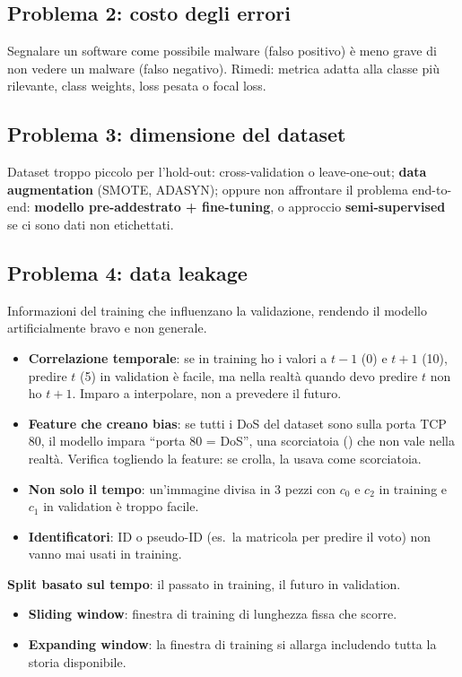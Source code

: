 \subsection{Problema 2: costo degli errori}
Segnalare un software come possibile malware (falso positivo) è meno grave di non vedere un malware (falso negativo).
Rimedi: metrica adatta alla classe più rilevante, class weights, loss pesata o focal loss.

\subsection{Problema 3: dimensione del dataset}
Dataset troppo piccolo per l'hold-out: cross-validation o leave-one-out; \textbf{data augmentation} (SMOTE, ADASYN);
oppure non affrontare il problema end-to-end: \textbf{modello pre-addestrato + fine-tuning}, o approccio
\textbf{semi-supervised} se ci sono dati non etichettati.

\subsection{Problema 4: data leakage}
\begin{definizione}
Informazioni del training che influenzano la validazione, rendendo il modello artificialmente bravo e non generale.
\end{definizione}
\begin{itemize}
  \item \textbf{Correlazione temporale}: se in training ho i valori a $t-1$ (0) e $t+1$ (10), predire $t$ (5) in validation è
        facile, ma nella realtà quando devo predire $t$ non ho $t+1$. Imparo a interpolare, non a prevedere il futuro.
  \item \textbf{Feature che creano bias}: se tutti i DoS del dataset sono sulla porta TCP 80, il modello impara ``porta 80 = DoS'',
        una scorciatoia () che non vale nella realtà. Verifica togliendo la feature: se crolla, la usava come scorciatoia.
  \item \textbf{Non solo il tempo}: un'immagine divisa in 3 pezzi con $c_0$ e $c_2$ in training e $c_1$ in validation è troppo facile.
  \item \textbf{Identificatori}: ID o pseudo-ID (es.\ la matricola per predire il voto) non vanno mai usati in training.
\end{itemize}
\textbf{Split basato sul tempo}: il passato in training, il futuro in validation.
\begin{itemize}
  \item \textbf{Sliding window}: finestra di training di lunghezza fissa che scorre.
  \item \textbf{Expanding window}: la finestra di training si allarga includendo tutta la storia disponibile.
\end{itemize}

